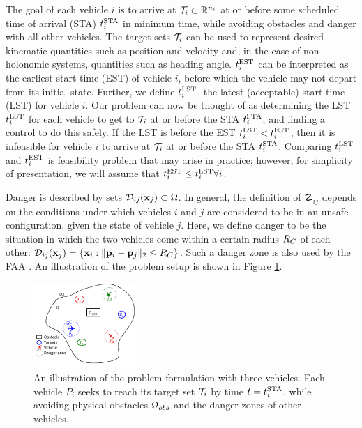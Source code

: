 The goal of each vehicle $i$ is to arrive at $\mathcal{T}_i \subset \mathbb{R}^{n_i}$ at or before some scheduled time of arrival (STA) $t^{\text{STA}}_i$ in minimum time, while avoiding obstacles and danger with all other vehicles. The target sets $\mathcal{T}_i$ can be used to represent desired kinematic quantities such as position and velocity and, in the case of non-holonomic systems, quantities such as heading angle.  $t^{\text{EST}}_i$ can be interpreted as the earliest start time (EST) of vehicle $i$, before which the vehicle may not depart from its initial state. Further, we define $t^{\text{LST}}_i$, the latest (acceptable) start time (LST) for vehicle $i$. Our problem can now be thought of as determining the LST $t^{\text{LST}}_i$ for each vehicle to get to $\mathcal{T}_i$ at or before the STA $t^{\text{STA}}_i$, and finding a control to do this safely. If the LST is before the EST $t^{\text{LST}}_i < t^{\text{EST}}_i$, then it is infeasible for vehicle $i$ to arrive at $\mathcal{T}_i$ at or before the STA $t^{\text{STA}}_i$. Comparing $t^{\text{LST}}_i$ and $t^{\text{EST}}_i$ is feasibility problem that may arise in practice; however, for simplicity of presentation, we will assume that $t^{\text{EST}}_i\le t^{\text{LST}}_i \forall i$.

Danger is described by sets $\mathcal{D}_{ij}(\mathbf{x}_j) \subset \Omega$. In general, the definition of $\danger_{ij}$ depends on the conditions under which vehicles $i$ and $j$ are considered to be in an unsafe configuration, given the state of vehicle $j$. Here, we define danger to be the situation in which the two vehicles come within a certain radius $R_C$ of each other: $\mathcal{D}_{ij}(\mathbf{x}_j) = \{\mathbf{x}_i: \| \mathbf{p}_i - \mathbf{p}_j\|_2 \le R_C \}$. Such a danger zone is also used by the FAA \cite{paglione99}. An illustration of the problem setup is shown in Figure \ref{fig:formulation}.

\begin{figure}
	\centering
	\includegraphics[width=0.35\textwidth]{"fig/formulation"}
	\caption{An illustration of the problem formulation with three vehicles. Each vehicle $P_i$ seeks to reach its target set $\mathcal{T}_i$ by time $t=t^{\text{STA}}_i$, while avoiding physical obstacles $\Omega_{obs}$ and the danger zones of other vehicles.}
	\label{fig:formulation}
\end{figure}

